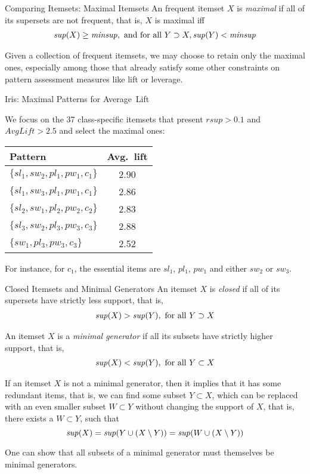 \begin{frame}{Comparing Itemsets: Maximal Itemsets}
An frequent itemset $X$ is {\em maximal}
if all of its supersets are not frequent, that is, $X$ is maximal iff
\begin{align*}
  \mathit{sup}(X) \ge \mathit{minsup}, \text{ and for all } Y \supset X, \mathit{sup}(Y) < \mathit{minsup}
\end{align*}

Given a collection of frequent itemsets, we may choose to retain only
the maximal ones, especially among those that already satisfy some other
constraints on pattern assessment measures like lift or leverage.
\end{frame}


\begin{frame}{Iris: Maximal Patterns for Average~Lift}

We focus on the 37 class-specific itemsets that present $rsup>0.1$ and $AvgLift>2.5$ and select the maximal ones:

\begin{center}
\begin{tabular}{|l|c|}
\hline
Pattern & Avg.\ lift\\ \hline
$\{sl_1, sw_2, pl_1, pw_1, c_1\}$ & 2.90 \\ \hline
$\{sl_1, sw_3, pl_1, pw_1, c_1\}$ & 2.86 \\ \hline
$\{sl_2, sw_1, pl_2, pw_2, c_2\}$ & 2.83 \\ \hline
$\{sl_3, sw_2, pl_3, pw_3, c_3\}$ & 2.88 \\ \hline
$\{sw_1, pl_3, pw_3, c_3\}$ & 2.52 \\ \hline
\end{tabular}%
\end{center}

For instance, for $c_1$, the essential items are $sl_1$, $pl_1$, $pw_1$ and either $sw_2$ or $sw_3$.
\end{frame}


\begin{frame}{Closed Itemsets and Minimal Generators}
An itemset $X$ is {\em closed}
if all of its supersets have strictly
less support, that is,
\begin{align*}
  \mathit{sup}(X) > \mathit{sup}(Y), \text{ for all } Y \supset X
\end{align*}

\medskip
An itemset $X$ is a {\em minimal generator}
if all its subsets
have strictly
higher support, that is,
\begin{align*}
  \mathit{sup}(X) < \mathit{sup}(Y), \text{ for all } Y \subset X
\end{align*}

\medskip
If an itemset $X$ is not a minimal generator, then
it implies that it has some redundant items, that is,
we can f\/{i}nd some subset $Y \subset X$, which can be replaced
with an
even smaller subset $W \subset Y$ without
changing the support of $X$, that is, there exists a $W \subset Y$, such
that
$$\mathit{sup}(X) =
\mathit{sup}(Y \cup (X\setminus Y)) =
\mathit{sup}(W \cup (X \setminus Y))$$

\medskip
One can show that all subsets of a minimal generator must themselves be
minimal generators.
\end{frame}

